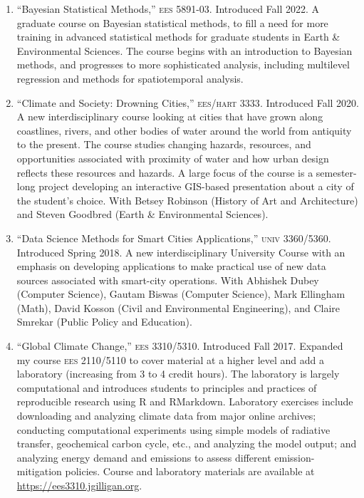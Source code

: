 %
%
\begin{enumerate}
\item ``Bayesian Statistical Methods,'' \textsc{ees 5891-03}.
Introduced Fall 2022. A graduate course on Bayesian statistical methods, to
fill a need for more training in advanced statistical methods for graduate
students in Earth \& Environmental Sciences. The course begins with an
introduction to Bayesian methods, and progresses to more sophisticated
analysis, including multilevel regression and methods for spatiotemporal
analysis.
\item ``Climate and Society: Drowning Cities,'' \textsc{ees/hart 3333}. Introduced Fall 2020. A new interdisciplinary course looking at cities that have grown along coastlines, rivers, and other bodies of water around the world from antiquity to the present. The course studies changing hazards, resources, and opportunities associated with proximity of water and how urban design reflects these resources and hazards. A large focus of the course is a semester-long project developing an interactive GIS-based presentation about a city of the student's choice. With Betsey Robinson (History of Art and Architecture) and Steven Goodbred (Earth \& Environmental Sciences).
\item ``Data Science Methods for Smart Cities Applications,'' \textsc{univ 3360/5360}. Introduced Spring 2018. A new interdisciplinary University Course with an emphasis on developing applications to make practical use of new data sources associated with smart-city operations. With Abhishek Dubey (Computer Science), Gautam Biswas (Computer Science), Mark Ellingham (Math), David Kosson (Civil and Environmental Engineering), and Claire Smrekar (Public Policy and Education).
\item ``Global Climate Change,'' \textsc{ees 3310/5310}. Introduced Fall 2017. Expanded my course \textsc{ees 2110/5110} to cover material at a higher level and add a laboratory (increasing from 3 to 4 credit hours).
The laboratory is largely computational and introduces students to principles and practices of reproducible research using R and RMarkdown. Laboratory exercises include downloading and analyzing climate data
from major online archives; conducting computational experiments using simple models of radiative transfer, geochemical carbon cycle, etc., and analyzing the model output; and analyzing energy demand and  emissions to assess different emission-mitigation policies. Course and laboratory materials are available at \url{https://ees3310.jgilligan.org}.

\end{enumerate}
